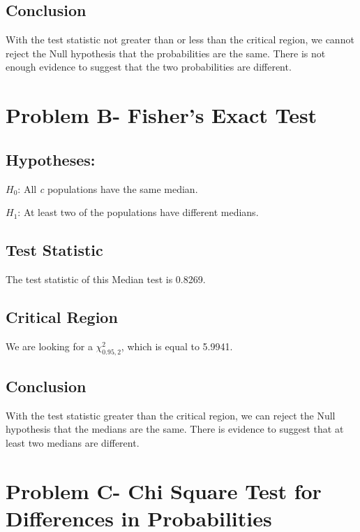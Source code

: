 \documentclass[]{tufte-handout}
\begin{document}
\subsection{Conclusion}\label{conclusion}

With the test statistic not greater than or less than the critical
region, we cannot reject the Null hypothesis that the probabilities are
the same. There is not enough evidence to suggest that the two
probabilities are different.

\section{Problem B- Fisher's Exact
Test}\label{problem-b--fishers-exact-test}

\subsection{Hypotheses:}\label{hypotheses-1}

\(H_{0}\): All \emph{c} populations have the same median.

\(H_{1}\): At least two of the populations have different medians.

\subsection{Test Statistic}\label{test-statistic-1}

The test statistic of this Median test is 0.8269.

\subsection{Critical Region}\label{critical-region-1}

We are looking for a \(\chi_{0.95, 2}^2\), which is equal to 5.9941.

\subsection{Conclusion}\label{conclusion-1}

With the test statistic greater than the critical region, we can reject
the Null hypothesis that the medians are the same. There is evidence to
suggest that at least two medians are different.

\section{Problem C- Chi Square Test for Differences in
Probabilities}\label{problem-c--chi-square-test-for-differences-in-probabilities}
\end{document}
